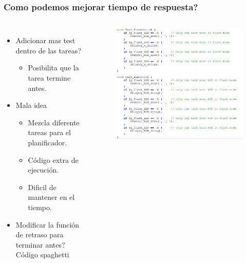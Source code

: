\documentclass[10.5pt,scale=1.0,t,aspectratio=169,hyperref={pdfpagelabels=false}]{beamer}
\begin{document}
\begin{frame}
	\frametitle{Como podemos mejorar tiempo de respuesta?}
\begin{columns}
	\begin{itemize}
		\item Adicionar mas test dentro de las tareas? 
		\begin{itemize}
			\item Posibilita que la tarea termine antes.
		\end{itemize}
		\item Mala idea
		\begin{itemize}
			\item Mezcla diferente tareas para el planificador.
			\item Código extra de ejecución.
			\item Dificil de mantener en el tiempo. 
		\end{itemize}
		\item Modificar la función de retraso para terminar antes? Código spaghetti
	\end{itemize}
	\begin{figure}
		\centering
		\includegraphics[scale=0.4]{11_MoreTest}
	\end{figure}
\end{columns}
	
\end{frame}
\end{document}
